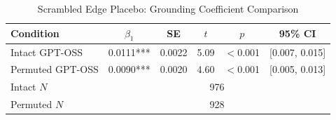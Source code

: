\begin{table}[htbp]
\centering
\small
\caption{Scrambled Edge Placebo: Grounding Coefficient Comparison}
\label{tab:lme_scrambled_comparison}
\begin{tabular}{lccccc}
\toprule
Condition & $\beta_1$ & SE & $t$ & $p$ & 95\% CI \\
\midrule
  Intact GPT-OSS & 0.0111*** & 0.0022 & 5.09 & $<$0.001 & [0.007, 0.015] \\
  Permuted GPT-OSS & 0.0090*** & 0.0020 & 4.60 & $<$0.001 & [0.005, 0.013] \\
\midrule
  Intact $N$ & \multicolumn{5}{c}{976} \\
  Permuted $N$ & \multicolumn{5}{c}{928} \\
\bottomrule
\end{tabular}
\end{table}
